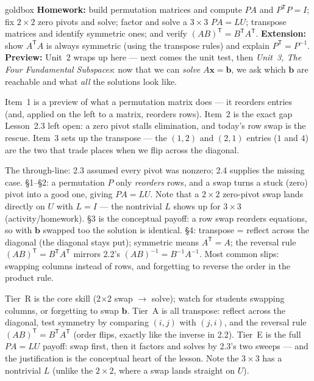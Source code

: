 \documentclass[10pt]{article}
\newcommand{\xx}{\mathbf{x}}
\newcommand{\bb}{\mathbf{b}}
\newcommand{\PP}{P}
\newcommand{\tp}{\mathsf{T}}
\begin{document}
\begin{skillbox}{goldbox}
\textbf{Homework:} build permutation matrices and compute $\PP A$ and $\PP^{\tp}\PP=I$; fix $2\times2$
zero pivots and solve; factor and solve a $3\times3$ $\PP A=LU$; transpose matrices and identify
symmetric ones; and verify $(AB)^{\tp}=B^{\tp}A^{\tp}$. \textbf{Extension:} show $A^{\tp}A$ is always
symmetric (using the transpose rules) and explain $\PP^{\tp}=\PP^{-1}$. \textbf{Preview:} Unit~2 wraps
up here --- next comes the unit test, then \emph{Unit~3, The Four Fundamental Subspaces}: now that we
can \emph{solve} $A\xx=\bb$, we ask which $\bb$ are reachable and what \emph{all} the solutions look
like.
\end{skillbox}

\begin{teachernote}[Warm-Up]
Item~1 is a preview of what a permutation matrix does --- it reorders entries (and, applied on the left
to a matrix, reorders rows). Item~2 is the exact gap Lesson~2.3 left open: a zero pivot stalls
elimination, and today's row swap is the rescue. Item~3 sets up the transpose --- the $(1,2)$ and
$(2,1)$ entries ($1$ and $4$) are the two that trade places when we flip across the diagonal.
\end{teachernote}

\begin{teachernote}
The through-line: 2.3 assumed every pivot was nonzero; 2.4 supplies the missing case. \S1--\S2: a
permutation $\PP$ only \emph{reorders} rows, and a swap turns a stuck (zero) pivot into a good one, giving
$\PP A=LU$. Note that a $2\times2$ zero-pivot swap lands directly on $U$ with $L=I$ --- the nontrivial
$L$ shows up for $3\times3$ (activity/homework). \S3 is the conceptual payoff: a row swap reorders
equations, so with $\bb$ swapped too the solution is identical. \S4: transpose = reflect across the
diagonal (the diagonal stays put); symmetric means $A^{\tp}=A$; the reversal rule
$(AB)^{\tp}=B^{\tp}A^{\tp}$ mirrors 2.2's $(AB)^{-1}=B^{-1}A^{-1}$. Most common slips: swapping columns
instead of rows, and forgetting to reverse the order in the product rule.
\end{teachernote}

\begin{teachernote}
Tier~R is the core skill (2$\times$2 swap $\to$ solve); watch for students swapping columns, or forgetting
to swap $\bb$. Tier~A is all transpose: reflect across the diagonal, test symmetry by comparing $(i,j)$
with $(j,i)$, and the reversal rule $(AB)^{\tp}=B^{\tp}A^{\tp}$ (order flips, exactly like the inverse in
2.2). Tier~E is the full $\PP A=LU$ payoff: swap first, then it factors and solves by 2.3's two sweeps ---
and the justification is the conceptual heart of the lesson. Note the $3\times3$ has a nontrivial $L$
(unlike the $2\times2$, where a swap lands straight on $U$).
\end{teachernote}
\end{document}
